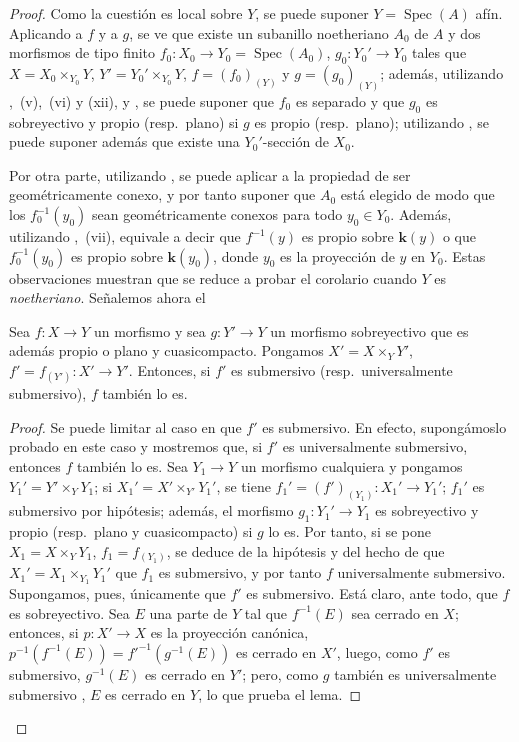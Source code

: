 \begin{proof}
Como la cuestión es local sobre $Y$, se puede suponer $Y=\operatorname{Spec}(A)$ afín.
Aplicando  a $f$ y a $g$, se ve que existe un subanillo noetheriano $A_0$ de $A$ y dos morfismos de tipo finito $f_0:X_0\to Y_0=\operatorname{Spec}(A_0)$, $g_0:Y_0'\to Y_0$ tales que $X=X_0\times_{Y_0}Y$, $Y'=Y_0'\times_{Y_0}Y$, $f=(f_0)_{(Y)}$ y $g=(g_0)_{(Y)}$; además, utilizando ,~(v),~(vi) y (xii), y , se puede suponer que $f_0$ es separado y que $g_0$ es sobreyectivo y propio (resp.\ plano) si $g$ es propio (resp.\ plano); utilizando , se puede suponer además que existe una $Y_0'$-sección de $X_0$.

Por otra parte, utilizando , se puede aplicar  a la propiedad de ser geométricamente conexo, y por tanto suponer que $A_0$ está elegido de modo que los $f_0^{-1}(y_0)$ sean geométricamente conexos para todo $y_0\in Y_0$.
Además, utilizando ,~(vii), equivale a decir que $f^{-1}(y)$ es propio sobre $\boldsymbol{k}(y)$ o que $f_0^{-1}(y_0)$ es propio sobre $\boldsymbol{k}(y_0)$, donde $y_0$ es la proyección de $y$ en $Y_0$.
Estas observaciones muestran que se reduce a probar el corolario cuando $Y$ es \emph{noetheriano}.
Señalemos ahora el

\begin{lemma}[15.7.11.1]
\label{IV.15.7.11.1}
Sea $f:X\to Y$ un morfismo y sea $g:Y'\to Y$ un morfismo sobreyectivo que es además propio \textup{o} plano y cuasicompacto.
Pongamos $X'=X\times_Y Y'$, $f'=f_{(Y')}:X'\to Y'$.
Entonces, si $f'$ es submersivo \textup{(resp.\ }universalmente submersivo\textup{)}, $f$ también lo es.
\end{lemma}

\begin{proof}
Se puede limitar al caso en que $f'$ es submersivo.
En efecto, supongámoslo probado en este caso y mostremos que, si $f'$ es universalmente submersivo, entonces $f$ también lo es.
Sea $Y_1\to Y$ un morfismo cualquiera y pongamos $Y_1'=Y'\times_Y Y_1$; si $X_1'=X'\times_{Y'}Y_1'$, se tiene $f_1'=(f')_{(Y_1)}:X_1'\to Y_1'$; $f_1'$ es submersivo por hipótesis; además, el morfismo $g_1:Y_1'\to Y_1$ es sobreyectivo y propio (resp.\ plano y cuasicompacto) si $g$ lo es.
Por tanto, si se pone $X_1=X\times_Y Y_1$, $f_1=f_{(Y_1)}$, se deduce de la hipótesis y del hecho de que $X_1'=X_1\times_{Y_1}Y_1'$ que $f_1$ es submersivo, y por tanto $f$ universalmente submersivo.
Supongamos, pues, únicamente que $f'$ es submersivo.
Está claro, ante todo, que $f$ es sobreyectivo.
Sea $E$ una parte de $Y$ tal que $f^{-1}(E)$ sea cerrado en $X$; entonces, si $p:X'\to X$ es la proyección canónica,
$p^{-1}(f^{-1}(E))=f'^{-1}(g^{-1}(E))$ es cerrado en $X'$, luego, como $f'$ es submersivo, $g^{-1}(E)$ es cerrado en $Y'$; pero, como $g$ también es universalmente submersivo , $E$ es cerrado en $Y$, lo que prueba el lema.
\end{proof}


\end{proof}
